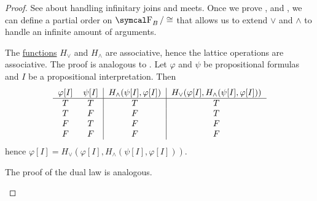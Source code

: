\begin{proof}
  See  about handling infinitary joins and meets. Once we prove ,  and , we can define a partial order on \( \CF_B / \cong \) that allows us to extend \( \vee \) and \( \wedge \) to handle an infinite amount of arguments.

  \begin{RefList}
     The \hyperref[def:truth_functions]{functions} \( H_\vee \) and \( H_\wedge \) are associative, hence the lattice operations are associative.
     The proof is analogous to .
     Let \( \varphi \) and \( \psi \) be propositional formulas and \( I \) be a propositional interpretation. Then
    \begin{equation*}
      \begin{tabular}{c c | c | c}
        \( \varphi[I] \) & \( \psi[I] \) & \( H_\wedge(\psi[I], \varphi[I]) \) & \( H_\vee(\varphi[I], H_\wedge(\psi[I], \varphi[I])) \) \\
        \hline
        \( T \)          & \( T \)       & \( T \)                            & \( T \)    \\
        \( T \)          & \( F \)       & \( F \)                            & \( T \)    \\
        \( F \)          & \( T \)       & \( F \)                            & \( F \)    \\
        \( F \)          & \( F \)       & \( F \)                            & \( F \)
      \end{tabular}
    \end{equation*}
    hence \( \varphi[I] = H_\vee(\varphi[I], H_\wedge(\psi[I], \varphi[I])) \).

    The proof of the dual law is analogous.


\end{RefList}
\end{proof}
